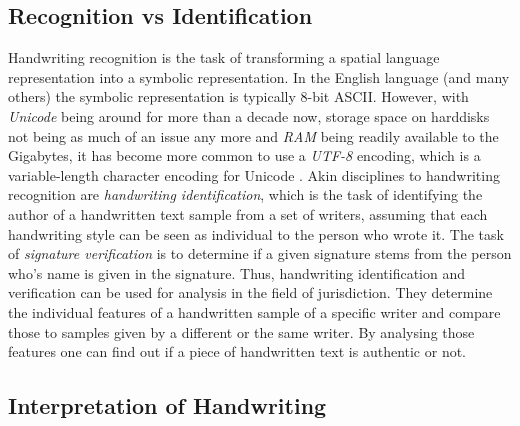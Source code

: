 \subsection{Recognition vs Identification}
\label{sec:recognitionvsidentification}

Handwriting recognition is the task of transforming a spatial language 
representation into a symbolic representation. In the English language
(and many others) the symbolic representation is typically 8-bit ASCII.
However, with \emph{Unicode} being around for more than a decade now,
storage space on harddisks not being as much of an issue any more and
\emph{RAM} being readily available to the Gigabytes, it has become more 
common to use a \emph{UTF-8}  encoding, which is a variable-length character 
encoding for Unicode .
Akin disciplines to handwriting recognition are 
\emph{handwriting identification}, which is the task of identifying the author
of a handwritten text sample from a set of writers, assuming that each
handwriting style can be seen as individual to the person who wrote it.
The task of \emph{signature verification} is to determine if a given signature
stems from the person who's name is given in the signature.
Thus, handwriting identification and verification can be used for 
analysis in the field of jurisdiction. They determine the individual features
of a handwritten sample of a specific writer and compare those
to samples given by a different or the same writer. By analysing those 
features one can find out if a piece of handwritten text is authentic or not.

\subsection{Interpretation of Handwriting}
\label{sec:interpretationofhandwriting}


